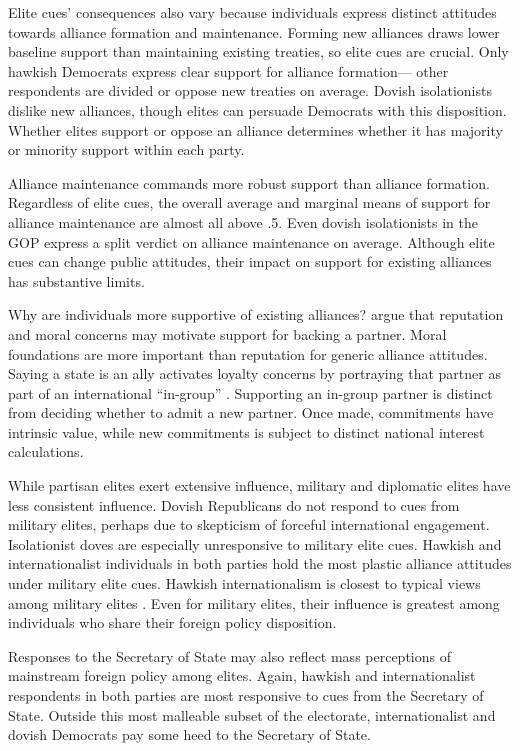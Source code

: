 \documentclass[12pt]{article}
\begin{document}
Elite cues' consequences also vary because individuals express distinct attitudes towards alliance formation and maintenance. 
Forming new alliances draws lower baseline support than maintaining existing treaties, so elite cues are crucial. 
Only hawkish Democrats express clear support for alliance formation--- other respondents are divided or oppose new treaties on average.
Dovish isolationists dislike new alliances, though elites can persuade Democrats with this disposition. 
Whether elites support or oppose an alliance determines whether it has majority or minority support within each party. 


Alliance maintenance commands more robust support than alliance formation. 
Regardless of elite cues, the overall average and marginal means of support for alliance maintenance are almost all above .5. 
Even dovish isolationists in the GOP express a split verdict on alliance maintenance on average.
Although elite cues can change public attitudes, their impact on support for existing alliances has substantive limits.


Why are individuals more supportive of existing alliances?
\citet{TomzWeeks2021} argue that reputation and moral concerns may motivate support for backing a partner.
Moral foundations are more important than reputation for generic alliance attitudes. 
Saying a state is an ally activates loyalty concerns by portraying that partner as part of an international ``in-group'' \citep[pg. 814]{TomzWeeks2021}. 
Supporting an in-group partner is distinct from deciding whether to admit a new partner.
Once made, commitments have intrinsic value, while new commitments is subject to distinct national interest calculations.


While partisan elites exert extensive influence, military and diplomatic elites have less consistent influence. 
Dovish Republicans do not respond to cues from military elites, perhaps due to skepticism of forceful international engagement.
Isolationist doves are especially unresponsive to military elite cues.
Hawkish and internationalist individuals in both parties hold the most plastic alliance attitudes under military elite cues.
Hawkish internationalism is closest to typical views among military elites \citep{ZwaldBerejikian2021}. 
Even for military elites, their influence is greatest among individuals who share their foreign policy disposition. 


Responses to the Secretary of State may also reflect mass perceptions of mainstream foreign policy among elites.
Again, hawkish and internationalist respondents in both parties are most responsive to cues from the Secretary of State.
Outside this most malleable subset of the electorate, internationalist and dovish Democrats pay some heed to the Secretary of State.  
\end{document}
